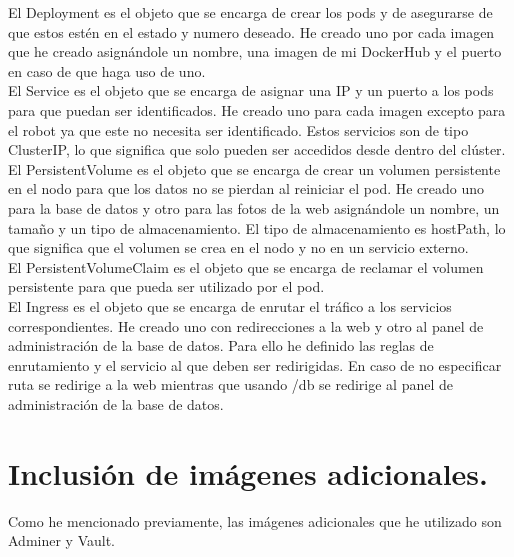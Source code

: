 \documentclass{report}
\begin{document}
            El Deployment es el objeto que se encarga de crear los pods y de asegurarse de que estos estén en el estado y numero deseado.
            He creado uno por cada imagen que he creado asignándole un nombre, una imagen de mi DockerHub y el puerto en caso de que haga uso de uno.\\

            El Service es el objeto que se encarga de asignar una IP y un puerto a los pods para que puedan ser identificados.
            He creado uno para cada imagen excepto para el robot ya que este no necesita ser identificado.
            Estos servicios son de tipo ClusterIP, lo que significa que solo pueden ser accedidos desde dentro del clúster.\\

            El PersistentVolume es el objeto que se encarga de crear un volumen persistente en el nodo para que los datos no se pierdan al reiniciar el pod.
            He creado uno para la base de datos y otro para las fotos de la web asignándole un nombre, un tamaño y un tipo de almacenamiento.
            El tipo de almacenamiento es hostPath, lo que significa que el volumen se crea en el nodo y no en un servicio externo.\\

            El PersistentVolumeClaim es el objeto que se encarga de reclamar el volumen persistente para que pueda ser utilizado por el pod.\\

            El Ingress es el objeto que se encarga de enrutar el tráfico a los servicios correspondientes.
            He creado uno con redirecciones a la web y otro al panel de administración de la base de datos.
            Para ello he definido las reglas de enrutamiento y el servicio al que deben ser redirigidas.
            En caso de no especificar ruta se redirige a la web mientras que usando /db se redirige al panel de administración de la base de datos.\\
        \clearpage
        \section{Inclusión de imágenes adicionales.}
            Como he mencionado previamente, las imágenes adicionales que he utilizado son Adminer y Vault.\\
            
\end{document}
